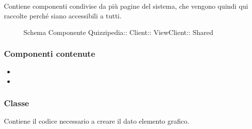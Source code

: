 \subsection{}
Contiene componenti condivise da più pagine del sistema, che vengono quindi qui raccolte perché siano accessibili a tutti.
\begin{figure}[H]
\centering
\noindent{}
\caption[Schema Componente Shared]{Schema Componente Quizzipedia:: Client:: ViewClient:: Shared}
\end{figure}
\subsubsection{Componenti contenute}
\begin{itemize}
\item {}
\item {}
\end{itemize}
\subsubsection{Classe }
Contiene il codice necessario a creare il dato elemento grafico.
